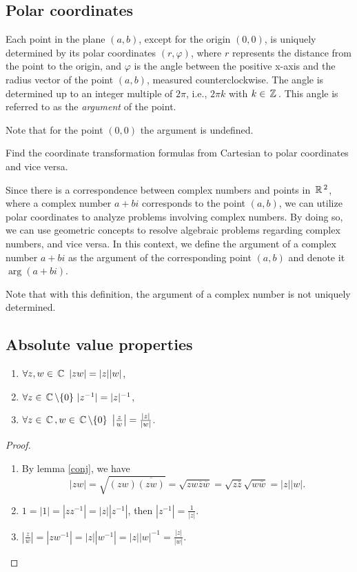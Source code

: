 \subsection{Polar coordinates}
Each point in the plane $(a, b)$, except for the origin $(0, 0)$, 
is uniquely determined by its polar coordinates $(r, \varphi)$, where $r$ represents the distance from the point to the origin, 
and $\varphi$ is the angle between the positive x-axis and the radius vector of the point $(a, b)$, measured counterclockwise. The angle is determined up to an integer multiple of $2\pi$, i.e., $2\pi k$ with $k\in\,\mathbb{Z}\,$. This angle is referred to as the {\it argument} of the point.

Note that for the point $(0, 0)$ the argument is undefined.

\begin{exercise}
Find the coordinate transformation formulas from Cartesian to polar coordinates and vice versa.
\end{exercise}

Since there is a correspondence between complex numbers and points in $\,\mathbb{R}\,^2$, where a complex number $a + bi$ corresponds to the point $(a, b)$, we can utilize polar coordinates to analyze problems involving complex numbers. By doing so, we can use geometric concepts to resolve algebraic problems regarding complex numbers, and vice versa. In this context, we define the argument of a complex number $a+bi$ as the argument of the corresponding point $(a, b)$ and denote it $\arg(a+bi)$. 

Note that with this definition, the argument of a complex number is not uniquely determined.

\subsection{Absolute value properties}
\begin{lemma}
\begin{enumerate}
\item $\forall z, w\in\,\mathbb{C}\, ~|zw| = |z||w|$,
\item $\forall z\in \,\mathbb{C}\,\backslash\{0\} ~ |z^{-1}| = |z|^{-1}$,
\item $\forall z\in\,\mathbb{C}\,, w\in\,\mathbb{C}\,\backslash\{0\} ~\left|\frac{z}{w}\right| = \frac{|z|}{|w|}$.
\end{enumerate}
\end{lemma}

\begin{proof}
\begin{enumerate}
\item By lemma \ref{conj}, we have
$$
|zw| = \sqrt{(zw)\overline{(zw)}} = \sqrt{zw\overline{z}\overline{w}} =
\sqrt{z\bar{z}}\sqrt{w\bar{w}} = |z||w|.
$$
\item $1 = |1| = |z z^{-1}| = |z| |z^{-1}|$, then $|z^{-1}| = \frac{1}{|z|}$.
\item $\left|\frac{z}{w}\right| = |zw^{-1}| = |z||w^{-1}| = |z||w|^{-1} = \frac{|z|}{|w|}.$
\end{enumerate}
\end{proof}

